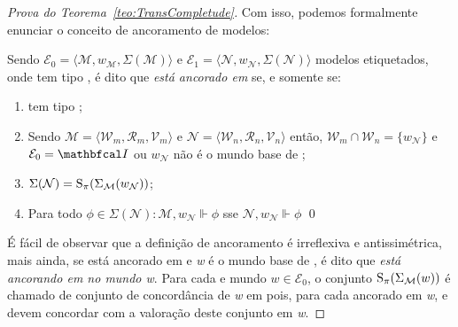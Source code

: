 \begin{apendicesenv}
\begin{proof}[Prova do Teorema~\ref{teo:TransCompletude}]
            Com isso, podemos formalmente enunciar o conceito de ancoramento de modelos:

            \begin{definicao}
                \label{def:Definicao2}
                Sendo \(\mathcal{E}_{0} = \langle \mathcal{M}, w_{\mathcal{M}}, \Sigma(\mathcal{M}) \rangle\) e \(\mathcal{E}_{1} = \langle \mathcal{N}, w_{\mathcal{N}}, \Sigma(\mathcal{N}) \rangle\)
                modelos etiquetados, onde  tem tipo \PI, é dito que \textit{ está ancorado em } se, e somente se:

                \begin{enumerate}[label=\textnormal{\ref{def:Definicao2}.\arabic*}]
                    \item {} tem tipo \OPI; \label{caso:Definicao2-1}

                    \item Sendo \(\mathcal{M} = \langle \mathcal{W}_{m}, \mathcal{R}_{m}, \mathcal{V}_{m} \rangle\) e
                    \(\mathcal{N} = \langle \mathcal{W}_{n}, \mathcal{R}_{n}, \mathcal{V}_{n} \rangle\) então,
                    \(\mathcal{W}_{m} \cap \mathcal{W}_{n} = \{w_{\mathcal{N}}\}\) e \(\mathcal{E}_{0} = \modeloinicial\) ou \(w_{\mathcal{N}}\)
                    não é o mundo base de ; \label{caso:Definicao2-2}

                    \item \(\Sigma(\mathcal{N}) = \operatorname{S}_{\pi}(\Sigma_{\mathcal{M}}(w_{\mathcal{N}}))\); \label{caso:Definicao2-3}

                    \item Para todo \(\phi \in \Sigma(\mathcal{N}): \mathcal{M}, w_{\mathcal{N}} \Vdash \phi\) sse \(\mathcal{N}, w_{\mathcal{N}} \Vdash \phi\) \label{caso:Definicao2-4} \qed
                \end{enumerate}
            \end{definicao}

            É fácil de observar que a definição de ancoramento é irreflexiva e antissimétrica, mais ainda, se  está ancorado em  e \textit{w} é o mundo base de
            , é dito que \textit{ está ancorando em  no mundo w}. Para cada \PImodelo {} e mundo \(w \in \mathcal{E}_{0}\),
            o conjunto \(\operatorname{S}_{\pi}(\Sigma_{\mathcal{M}}(w))\) é chamado de conjunto de concordância de \textit{w} em  pois, para cada \OPImodelo {} ancorado
            em \textit{w},  e  devem concordar com a valoração deste conjunto em \textit{w}.


\end{proof}
\end{apendicesenv}
